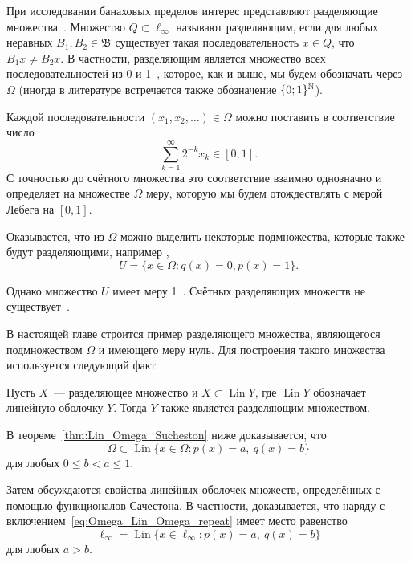 При исследовании банаховых пределов интерес представляют разделяющие множества~\cite[\S 3]{Semenov2014geomprops}.
Множество $Q\subset\ell_\infty$ называют разделяющим, если
для любых неравных $B_1, B_2\in\mathfrak{B}$ существует такая последовательность $x\in Q$,
что $B_1 x \neq B_2 x$.
В частности, разделяющим является множество всех последовательностей из 0 и 1~\cite{semenov2010characteristic},
которое, как и выше, мы будем обозначать через $\Omega$
(иногда в литературе встречается также обозначение $\{0;1\}^{\mathbb{N}}$).

Каждой последовательности $(x_1, x_2, \dots)\in \Omega$ можно поставить в соответствие число
\begin{equation}\label{eq:bijection_omega_0_1}
	\sum_{k=1}^\infty 2^{-k} x_k \in [0,1]
	.
\end{equation}
С точностью до счётного множества это соответствие взаимно однозначно и определяет на множестве $\Omega$ меру,
которую мы будем отождествлять с мерой Лебега на $[0,1]$.

Оказывается, что из $\Omega$ можно выделить некоторые подмножества, которые также будут разделяющими,
например \cite[\S 3, Теорема 11]{Semenov2014geomprops},
\begin{equation}
	U = \{ x\in\Omega: q(x) = 0, p(x) = 1 \}
	.
\end{equation}

Однако множество $U$ имеет меру 1~\cite{semenov2010characteristic}.
Счётных разделяющих множеств не существует~\cite[{следствие 22}]{Semenov2014geomprops}.

В настоящей главе строится пример разделяющего множества,
являющегося подмножеством $\Omega$ и имеющего меру нуль.
Для построения такого множества используется следующий факт.

\begin{proposition}
	Пусть $X$~--- разделяющее множество и $X \subset \operatorname{Lin} Y$,
	где $\operatorname{Lin} Y$ обозначает линейную оболочку $Y$.
	Тогда $Y$ также является разделяющим множеством.
\end{proposition}

В теореме~\ref{thm:Lin_Omega_Sucheston} ниже доказывается, что
\begin{equation}
	\label{eq:Omega_Lin_Omega_repeat}
	\Omega \subset \operatorname{Lin}\{x\in\Omega : p(x) = a,~ q(x) = b\}
\end{equation}
для любых $0\leq b < a \leq 1$.

Затем обсуждаются свойства линейных оболочек множеств, определённых с помощью функционалов Сачестона.
В частности, доказывается,
что наряду с включением~\eqref{eq:Omega_Lin_Omega_repeat}
имеет место равенство
\begin{equation}
	\ell_\infty = \operatorname{Lin}\{x\in\ell_\infty : p(x) = a,~ q(x) = b\}
\end{equation}
для любых $a>b$.

